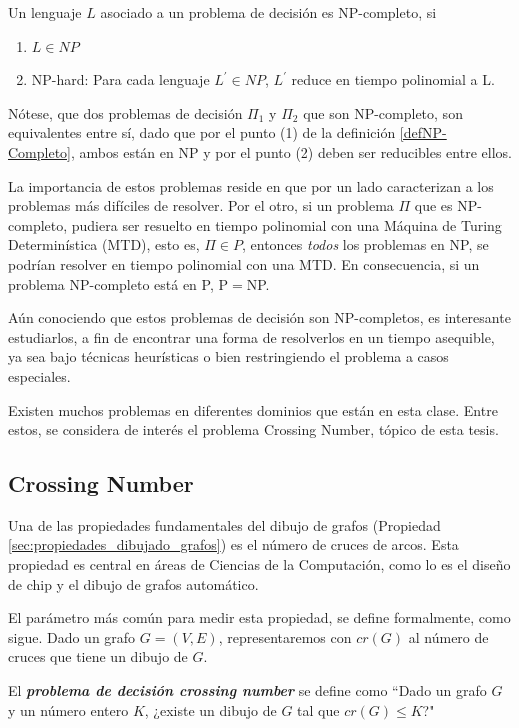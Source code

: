 \begin{definition}\label{defNP-Completo}\cite{garey1979computers}
Un lenguaje $L$ asociado a un problema de decisión es NP-completo,  si 
\begin{enumerate}
    \item $L\in NP$
    \item NP-hard: Para cada lenguaje $L^{\prime}\in NP$,  $L^{\prime}$ reduce  en tiempo polinomial a L.
\end{enumerate}
\end{definition}
Nótese,  que dos  problemas de decisión $\Pi_1$ y $\Pi_2$ que son NP-completo, son  equivalentes entre sí,  dado que por el  punto (1) de la definición \ref{defNP-Completo}, ambos están en NP y por el punto (2) deben ser reducibles entre ellos. 

La importancia de estos problemas reside en que por un lado caracterizan a los problemas más difíciles de resolver. 
Por el otro, si un problema $\Pi$  que es NP-completo, pudiera ser resuelto en tiempo polinomial con una Máquina de Turing Determinística (MTD),  esto es,  $\Pi\in P$,  entonces {\em todos} los  problemas en NP, se podrían resolver en tiempo polinomial con una MTD. En consecuencia, si  un problema  NP-completo está en P, P$=$NP.

Aún conociendo que  estos problemas de decisión son NP-completos,  es interesante estudiarlos, a fin de encontrar   una forma de resolverlos  en un tiempo asequible, ya sea bajo técnicas heurísticas o bien restringiendo el problema a casos especiales.

Existen muchos problemas en diferentes dominios que están  en esta clase.  Entre estos, se considera de interés el problema  Crossing Number, tópico de esta tesis.

\subsection{Crossing Number}
\label{sec:crossing_number}
Una de las propiedades fundamentales del dibujo de grafos (Propiedad \ref{sec:propiedades_dibujado_grafos}) es el número de cruces de arcos. Esta propiedad  es central  en áreas de Ciencias de la Computación, como lo es el diseño  de chip y el dibujo de grafos automático.


El parámetro más común para medir esta propiedad,  se define formalmente, como sigue. Dado  un grafo $G=(V,E)$,  representaremos con  $cr(G)$   al  número de cruces que tiene un dibujo de $G$.

El \emph{\bf problema de decisión   crossing number} se define como \cite{garey1983crossing} ``Dado un grafo $G$ y un número entero $K$, ¿existe un dibujo de $G$ tal que $cr(G) \leq K$?"

